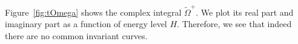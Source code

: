 \documentclass[a4paper]{amsart}
\theoremstyle{remark}
\begin{document}
Figure~\ref{fig:tOmega} shows the complex integral $\tilde \Omega^+$. We plot
its real part and imaginary part as a function of energy level $H$.
Therefore, we see that indeed there are no common invariant curves.

\end{document}
